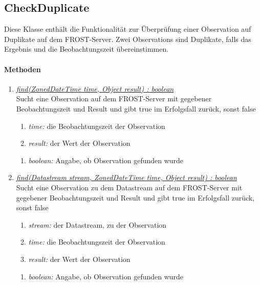 \subsection*{CheckDuplicate}

Diese Klasse enthält die Funktionalität zur Überprüfung einer Observation auf Duplikate auf dem FROST-Server.
Zwei Observations sind Duplikate, falls das Ergebnis und die Beobachtungszeit übereinstimmen.

\paragraph{Methoden}
	
	\begin{enumerate}[+]
\item \underline{\textit{find(ZonedDateTime time, Object result) : boolean}}\\
Sucht eine Observation auf dem FROST-Server mit gegebener Beobachtungszeit und Result und gibt true im Erfolgsfall zurück, sonst false
\begin{enumerate}[$\bullet$]
\item \textit{time:} die Beobachtungszeit der Observation
\item \textit{result:} der Wert der Observation
\end{enumerate}
\vspace{-0.2cm}
\begin{enumerate}[$\circ$]
\item \textit{boolean:} Angabe, ob Observation gefunden wurde
\end{enumerate}
	
\item \underline{\textit{find(Datastream stream, ZonedDateTime time, Object result) : boolean}}\\
Sucht eine Observation zu dem Datastream auf dem FROST-Server mit gegebener Beobachtungszeit und Result und gibt true im Erfolgsfall zurück, sonst false

\begin{enumerate}[$\bullet$]
\item \textit{stream:} der Datastream, zu der Observation
\item \textit{time:} die Beobachtungszeit der Observation
\item \textit{result:} der Wert der Observation
\end{enumerate}
\vspace{-0.2cm}
\begin{enumerate}[$\circ$]
\item \textit{boolean:} Angabe, ob Observation gefunden wurde
\end{enumerate}


\end{enumerate}
